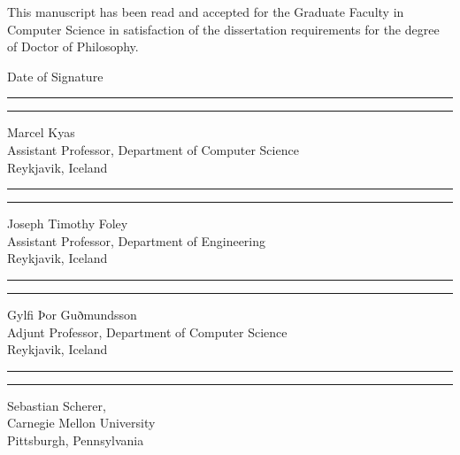 \noindent This manuscript has been read and accepted for the Graduate Faculty in
Computer Science in satisfaction of the dissertation requirements for the
degree of Doctor of Philosophy.

\bigskip

\hfill {Date of Signature}

\vspace{1.5\baselineskip}

\noindent\rule{3.5in}{0.7pt} \hfill \rule{1in}{0.7pt}

\noindent Marcel Kyas\\
Assistant Professor, Department of Computer Science\\ Reykjavik, Iceland
\vspace{1.5\baselineskip}

\noindent\rule{3.5in}{0.7pt} \hfill \rule{1in}{0.7pt}

\noindent Joseph Timothy Foley\\
Assistant Professor, Department of Engineering\\ Reykjavik, Iceland
\vspace{1.5\baselineskip}

\noindent\rule{3.5in}{0.7pt} \hfill \rule{1in}{0.7pt}

\noindent Gylfi Þor Guðmundsson\\
Adjunt Professor, Department of Computer Science\\Reykjavik, Iceland \par
\vspace{1.5\baselineskip}
\noindent\rule{3.5in}{0.7pt} \hfill \rule{1in}{0.7pt}

\noindent Sebastian Scherer,\\
Carnegie Mellon University\\Pittsburgh, Pennsylvania \\ 
\vspace{1\baselineskip}

\clearpage
